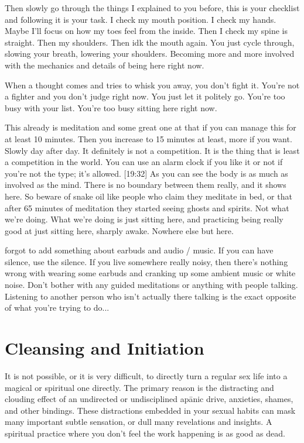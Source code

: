 \documentclass[a4paper,14pt]{memoir}
\newcommand{\apanic}{apānic}
\begin{document}
Then slowly go through the things I explained to you before, this is your checklist and following it is your task. I check my mouth position. I check my hands. Maybe I'll focus on how my toes feel from the inside. Then I check my spine is straight. Then my shoulders. Then idk the mouth again. You just cycle through, slowing your breath, lowering your shoulders. Becoming more and more involved with the mechanics and details of being here right now.

When a thought comes and tries to whisk you away, you don't fight it. You're not a fighter and you don't judge right now. You just let it politely go. You're too busy with your list. You're too busy sitting here right now. 

This already is meditation and some great one at that if you can manage this for at least 10 minutes. Then you increase to 15 minutes at least, more if you want. Slowly day after day. It definitely is not a competition. It is the thing that is least a competition in the world. You can use an alarm clock if you like it or not if you're not the type; it's allowed.
[19:32]
As you can see the body is as much as involved as the mind. There is no boundary between them really, and it shows here. So beware of snake oil like people who claim they meditate in bed, or that after 65 minutes of meditation they started seeing ghosts and spirits. Not what we're doing. What we're doing is just sitting here, and practicing being really good at just sitting here, sharply awake. Nowhere else but here.

forgot to add something about earbuds and audio / music. If you can have silence, use the silence. If you live somewhere really noisy, then there's nothing wrong with wearing some earbuds and cranking up some ambient music or white noise. Don't bother with any guided meditations or anything with people talking. Listening to another person who isn't actually there talking is the exact opposite of what you're trying to do...

\section{Cleansing and Initiation}

It is not possible, or it is very difficult, to directly turn a regular sex life into a magical or spiritual one directly. The primary reason is the distracting and clouding effect of an undirected or undisciplined \apanic{} drive, anxieties, shames, and other bindings. These distractions embedded in your sexual habits can mask many important subtle sensation, or dull many revelations and insights. A spiritual practice where you don't feel the work happening is as good as dead.
\end{document}
